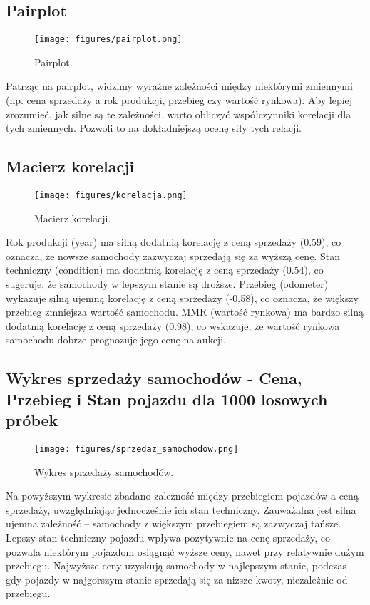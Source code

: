 \documentclass[10pt,letterpaper]{article}
\begin{document}
\subsection{Pairplot}
\begin{figure}[H]
\begin{center}
   \texttt{[image: figures/pairplot.png]}
   \caption{Pairplot.}
   \label{fig:other-figure-log}
\end{center}
\end{figure}
Patrząc na pairplot, widzimy wyraźne zależności między niektórymi zmiennymi (np. cena sprzedaży a rok produkcji, przebieg czy wartość rynkowa). Aby lepiej zrozumieć, jak silne są te zależności, warto obliczyć współczynniki korelacji dla tych zmiennych. Pozwoli to na dokładniejszą ocenę siły tych relacji.

\subsection{Macierz korelacji}
\begin{figure}[H]
\begin{center}
   \texttt{[image: figures/korelacja.png]}
   \caption{Macierz korelacji.}
   \label{fig:other-figure-log}
\end{center}
\end{figure}
Rok produkcji (year) ma silną dodatnią korelację z ceną sprzedaży (0.59), co oznacza, że nowsze samochody zazwyczaj sprzedają się za wyższą cenę. Stan techniczny (condition) ma dodatnią korelację z ceną sprzedaży (0.54), co sugeruje, że samochody w lepszym stanie są droższe. Przebieg (odometer) wykazuje silną ujemną korelację z ceną sprzedaży (-0.58), co oznacza, że większy przebieg zmniejsza wartość samochodu. MMR (wartość rynkowa) ma bardzo silną dodatnią korelację z ceną sprzedaży (0.98), co wskazuje, że wartość rynkowa samochodu dobrze prognozuje jego cenę na aukcji.

\subsection{Wykres sprzedaży samochodów - Cena, Przebieg i Stan pojazdu dla 1000 losowych próbek}
\begin{figure}[H]
\begin{center}
   \texttt{[image: figures/sprzedaz\_samochodow.png]}
   \caption{Wykres sprzedaży samochodów.}
   \label{fig:other-figure-log}
\end{center}
\end{figure}
Na powyższym wykresie zbadano zależność między przebiegiem pojazdów a ceną sprzedaży, uwzględniając jednocześnie ich stan techniczny. Zauważalna jest silna ujemna zależność – samochody z większym przebiegiem są zazwyczaj tańsze. Lepszy stan techniczny pojazdu wpływa pozytywnie na cenę sprzedaży, co pozwala niektórym pojazdom osiągnąć wyższe ceny, nawet przy relatywnie dużym przebiegu. Najwyższe ceny uzyskują samochody w najlepszym stanie, podczas gdy pojazdy w najgorszym stanie sprzedają się za niższe kwoty, niezależnie od przebiegu.
\end{document}
